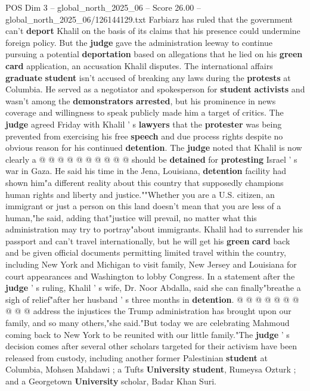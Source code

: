 \begin{textsample}{POS Dim 3 – global\_north\_2025\_06 – Score 26.00 – global\_north\_2025\_06/126144129.txt}
Farbiarz has ruled that the government can't \textbf{deport} Khalil on the basis of its claims that his presence could undermine foreign policy.
But the \textbf{judge} gave the administration leeway to continue pursuing a potential \textbf{deportation} based on allegations that he lied on his \textbf{green} \textbf{card} application, an accusation Khalil disputes.
The international affairs \textbf{graduate} \textbf{student} isn't accused of breaking any laws during the \textbf{protests} at Columbia.
He served as a negotiator and spokesperson for \textbf{student} \textbf{activists} and wasn't among the \textbf{demonstrators} \textbf{arrested}, but his prominence in news coverage and willingness to speak publicly made him a target of critics.
The \textbf{judge} agreed Friday with Khalil ' s \textbf{lawyers} that the \textbf{protester} was being prevented from exercising his free \textbf{speech} and due process rights despite no obvious reason for his continued \textbf{detention}.
The \textbf{judge} noted that Khalil is now clearly a @ @ @ @ @ @ @ @ @ @ should be \textbf{detained} for \textbf{protesting} Israel ' s war in Gaza.
He said his time in the Jena, Louisiana, \textbf{detention} facility had shown him"a different reality about this country that supposedly champions human rights and liberty and justice.""Whether you are a U.S. citizen, an immigrant or just a person on this land doesn't mean that you are less of a human,"he said, adding that"justice will prevail, no matter what this administration may try to portray"about immigrants.
Khalil had to surrender his passport and can't travel internationally, but he will get his \textbf{green} \textbf{card} back and be given official documents permitting limited travel within the country, including New York and Michigan to visit family, New Jersey and Louisiana for court appearances and Washington to lobby Congress.
In a statement after the \textbf{judge} ' s ruling, Khalil ' s wife, Dr.
Noor Abdalla, said she can finally"breathe a sigh of relief"after her husband ' s three months in \textbf{detention}. @ @ @ @ @ @ @ @ @ @ address the injustices the Trump administration has brought upon our family, and so many others,"she said."But today we are celebrating Mahmoud coming back to New York to be reunited with our little family."The \textbf{judge} ' s decision comes after several other scholars targeted for their activism have been released from custody, including another former Palestinian \textbf{student} at Columbia, Mohsen Mahdawi ; a Tufts \textbf{University} \textbf{student}, Rumeysa Ozturk ; and a Georgetown \textbf{University} scholar, Badar Khan Suri.

\end{textsample}
